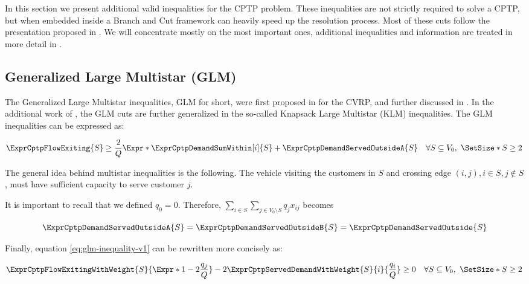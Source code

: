 In this section we present additional valid inequalities for the CPTP problem.
These inequalities are not strictly required to solve a CPTP, but when embedded inside a Branch and Cut framework can heavily speed up the resolution process.
Most of these cuts follow the presentation proposed in \cite{jepsen2014}.
We will concentrate mostly on the most important ones, additional inequalities and information are treated in more detail in \cite{jepsen2014}.

\subsection{Generalized Large Multistar (GLM)}
The Generalized Large Multistar inequalities, GLM for short, were first proposed in \cite{gouveia1995} for the CVRP, and further discussed in \cite{letchford2006}.
In the additional work of \cite{letchford2002}, the GLM cuts are further generalized in the so-called Knapsack Large Multistar (KLM) inequalities.
The GLM inequalities can be expressed as:

\begin{equation}\label{eq:glm-inequality-v1}
	\begin{split}
		\ExprCptpFlowExiting{S} \ge \frac{2}{Q} \Expr*{  \ExprCptpDemandSumWithin[i]{S} + \ExprCptpDemandServedOutsideA{S} } \quad \forall S \subseteq V_0,\ \SetSize*{S} \ge 2
	\end{split}
\end{equation}

The general idea behind multistar inequalities is the following.
The vehicle visiting the customers in $S$ and crossing edge $(i, j), i \in S, j \notin S$,
must have sufficient capacity to serve customer $j$.

It is important to recall that we defined $q_0 = 0$.
Therefore, $\sum_{i \in S} \sum_{j \in V_0 \setminus S} q_j  x_{ij}$ becomes

\begin{equation}
	\ExprCptpDemandServedOutsideA{S} = \ExprCptpDemandServedOutsideB{S} =\ExprCptpDemandServedOutside{S}
\end{equation}

Finally, equation \eqref{eq:glm-inequality-v1} can be rewritten more concisely as:

\begin{equation}\label{eq:glm-inequality}
	\begin{split}
		\ExprCptpFlowExitingWithWeight{S}{\Expr*{1 - 2 \frac{q_j}{Q}}} - 2 	\ExprCptpServedDemandWithWeight{S}{i}{\frac{q_i}{Q}}  \ge  0   \quad \forall S \subseteq V_0,\ \SetSize*{S} \ge 2
	\end{split}
\end{equation}

